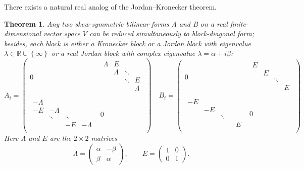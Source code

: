 \documentclass[12pt]{article}
\newtheorem{theorem}[lemma]{Theorem}
\theoremstyle{definition}
\begin{document}
There exists a natural real analog of the Jordan–Kronecker theorem.


\begin{theorem} Any two skew-symmetric bilinear forms A and B on a real finite-dimensional vector space $V$ can be reduced simultaneously to block-diagonal form; besides, each block is either
a Kronecker block or a Jordan block with eigenvalue $\lambda \in \mathbb{R} \cup \left\{\infty \right\}$ or a real Jordan block with
complex eigenvalue $\lambda = \alpha + i \beta$:
\[A_i =\left(
\begin{array}{c|c}
  0 & \begin{matrix}
   \Lambda &E&        & \\
      & \Lambda & \ddots &     \\
      &        & \ddots & E  \\
      &        &        & \Lambda   \\
    \end{matrix} \\
  \hline
  \begin{matrix}
  \minus\Lambda  &        &   & \\
  \minus E   & \minus\Lambda &     &\\
      & \ddots & \ddots &  \\
      &        & \minus E   & \minus \Lambda \\
  \end{matrix} & 0
 \end{array}
 \right)
\quad  B_i= \left(
\begin{array}{c|c}
  0 & \begin{matrix}
    E & &        & \\
      & E &  &     \\
      &        & \ddots &   \\
      &        &        & E   \\
    \end{matrix} \\
  \hline
  \begin{matrix}
  \minus E  &        &   & \\
     & \minus E &     &\\
      &  & \ddots &  \\
      &        &    & \minus E  \\
  \end{matrix} & 0
 \end{array}
 \right) \]
Here $\Lambda$ and $E$ are the $2 \times 2$ matrices
\[ \Lambda =\left( \begin{matrix} \alpha & - \beta \\ \beta & \alpha \end{matrix} \right), \qquad 
 E = \left( \begin{matrix} 1 & 0 \\ 0 & 1 \end{matrix} \right).\]
\end{theorem}
\end{document}
